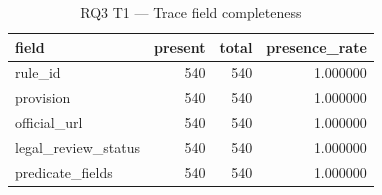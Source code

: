 \begin{table}
\caption{RQ3 T1 — Trace field completeness}
\label{tab:rq3_t1_trace_field_presence}
\begin{tabular}{lrrr}
\toprule
field & present & total & presence\_rate \\
\midrule
rule\_id & 540 & 540 & 1.000000 \\
provision & 540 & 540 & 1.000000 \\
official\_url & 540 & 540 & 1.000000 \\
legal\_review\_status & 540 & 540 & 1.000000 \\
predicate\_fields & 540 & 540 & 1.000000 \\
\bottomrule
\end{tabular}
\end{table}
